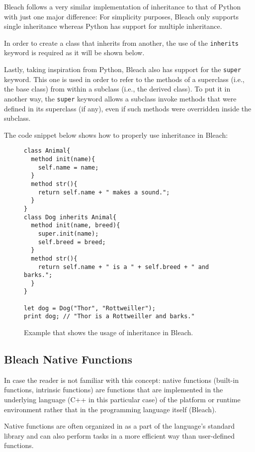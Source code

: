 \begin{itemize}
    Bleach follows a very similar implementation of inheritance to that of Python with just one major difference: For simplicity purposes, Bleach only supports single inheritance whereas Python has support for multiple inheritance.

    In order to create a class that inherits from another, the use of the \texttt{inherits} keyword is required as it will be shown below.

    Lastly, taking inspiration from Python, Bleach also has support for the \texttt{super} keyword. This one is used in order to refer to the methods of a superclass (i.e., the base class) from within a subclass (i.e., the derived class). To put it in another way, the \texttt{super} keyword allows a subclass invoke methods that were defined in its superclass (if any), even if such methods were overridden inside the subclass. 

    The code snippet below shows how to properly use inheritance in Bleach:
\begin{figure}[H]
    \centering
    \begin{lstlisting}
class Animal{
  method init(name){
    self.name = name;
  }
  method str(){
    return self.name + " makes a sound.";
  }
}
class Dog inherits Animal{
  method init(name, breed){
    super.init(name);
    self.breed = breed;
  }
  method str(){
    return self.name + " is a " + self.breed + " and barks.";
  }
}

let dog = Dog("Thor", "Rottweiller");
print dog; // "Thor is a Rottweiller and barks."
    \end{lstlisting}
    \caption{Example that shows the usage of inheritance in Bleach.}
\end{figure}
    
\end{itemize}

\subsection{Bleach Native Functions}
In case the reader is not familiar with this concept: native functions (built-in functions, intrinsic functions) are functions that are implemented in the underlying language (C++ in this particular case) of the platform or runtime environment rather that in the programming language itself (Bleach).

Native functions are often organized in as a part of the language's standard library and can also perform tasks in a more efficient way than user-defined functions.

